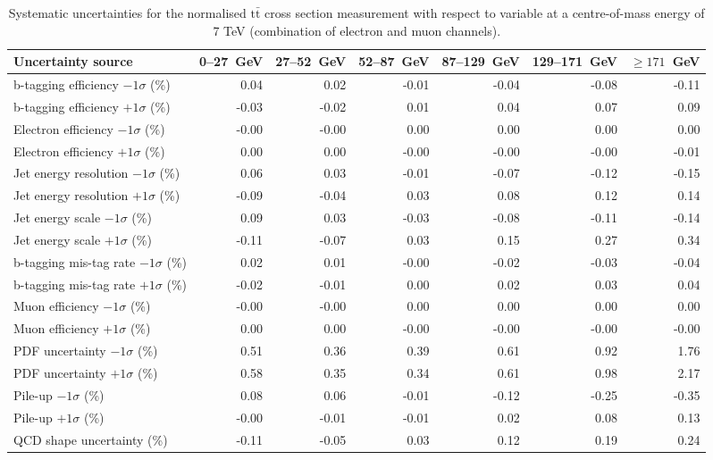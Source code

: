 \documentclass{article}
\newcommand{\ttbar}{\ensuremath{\text{t}\bar{\text{t}}}\xspace}
\newcommand{\GeV}{GeV}
\begin{document}
\begin{table}[htbp]
\centering
\caption{Systematic uncertainties for the normalised \ttbar cross section measurement with respect to \MET variable
at a centre-of-mass energy of 7 TeV (combination of electron and muon channels).}
\label{tab:MET_systematics_7TeV_combined}
\resizebox{\columnwidth}{!} {
\begin{tabular}{lrrrrrr}
\hline
Uncertainty source & 0--27~\GeV& 27--52~\GeV& 52--87~\GeV& 87--129~\GeV& 129--171~\GeV& $\geq 171$~\GeV \\
\hline
b-tagging efficiency $-1\sigma$ (\%) & 0.04 & 0.02 & -0.01 & -0.04 & -0.08 & -0.11 \\ 
b-tagging efficiency $+1\sigma$ (\%) & -0.03 & -0.02 & 0.01 & 0.04 & 0.07 & 0.09 \\ 
Electron efficiency $-1\sigma$ (\%) & -0.00 & -0.00 & 0.00 & 0.00 & 0.00 & 0.00 \\ 
Electron efficiency $+1\sigma$ (\%) & 0.00 & 0.00 & -0.00 & -0.00 & -0.00 & -0.01 \\ 
Jet energy resolution $-1\sigma$ (\%) & 0.06 & 0.03 & -0.01 & -0.07 & -0.12 & -0.15 \\ 
Jet energy resolution $+1\sigma$ (\%) & -0.09 & -0.04 & 0.03 & 0.08 & 0.12 & 0.14 \\ 
Jet energy scale $-1\sigma$ (\%) & 0.09 & 0.03 & -0.03 & -0.08 & -0.11 & -0.14 \\ 
Jet energy scale $+1\sigma$ (\%) & -0.11 & -0.07 & 0.03 & 0.15 & 0.27 & 0.34 \\ 
b-tagging mis-tag rate $-1\sigma$ (\%) & 0.02 & 0.01 & -0.00 & -0.02 & -0.03 & -0.04 \\ 
b-tagging mis-tag rate $+1\sigma$ (\%) & -0.02 & -0.01 & 0.00 & 0.02 & 0.03 & 0.04 \\ 
Muon efficiency $-1\sigma$ (\%) & -0.00 & -0.00 & 0.00 & 0.00 & 0.00 & 0.00 \\ 
Muon efficiency $+1\sigma$ (\%) & 0.00 & 0.00 & -0.00 & -0.00 & -0.00 & -0.00 \\ 
PDF uncertainty $-1\sigma$ (\%) & 0.51 & 0.36 & 0.39 & 0.61 & 0.92 & 1.76 \\ 
PDF uncertainty $+1\sigma$ (\%) & 0.58 & 0.35 & 0.34 & 0.61 & 0.98 & 2.17 \\ 
Pile-up $-1\sigma$ (\%) & 0.08 & 0.06 & -0.01 & -0.12 & -0.25 & -0.35 \\ 
Pile-up $+1\sigma$ (\%) & -0.00 & -0.01 & -0.01 & 0.02 & 0.08 & 0.13 \\ 
QCD shape uncertainty (\%) & -0.11 & -0.05 & 0.03 & 0.12 & 0.19 & 0.24 \\ 

\end{tabular}}
\end{table}
\end{document}
